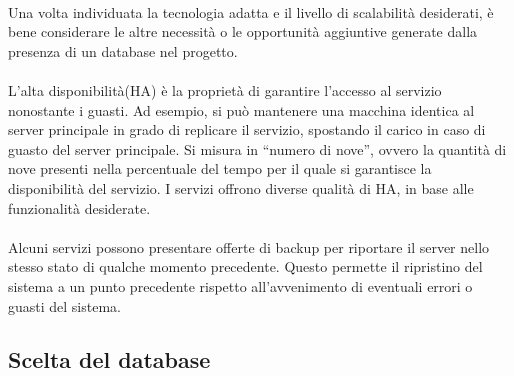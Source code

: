 \\
Una volta individuata la tecnologia adatta e il livello di scalabilità desiderati,
è bene considerare le altre necessità o le opportunità aggiuntive generate
dalla presenza di un database nel progetto. \\
\\
L'alta disponibilità(HA) è la proprietà di garantire l'accesso al servizio nonostante i guasti.
Ad esempio, si può mantenere una macchina identica al server principale in grado di replicare il servizio,
spostando il carico in caso di guasto del server principale.
Si misura in “numero di nove”, ovvero la quantità di nove presenti
nella percentuale del tempo per il quale si garantisce la disponibilità del servizio.
I servizi offrono diverse qualità di HA, in base alle funzionalità desiderate.\\
\\
Alcuni servizi possono presentare offerte di backup
per riportare il server nello stesso stato di qualche momento precedente.
Questo permette il ripristino del sistema a un punto precedente
rispetto all'avvenimento di eventuali errori o guasti del sistema.

\subsection{Scelta del database}

